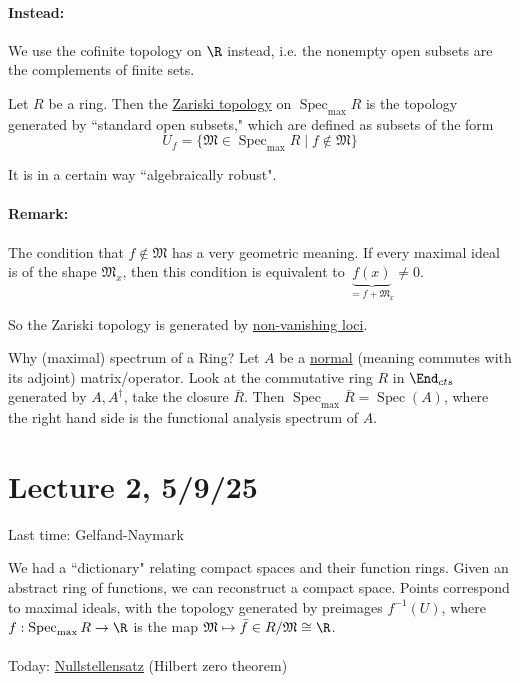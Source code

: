 \documentclass[x11names,reqno,14pt]{extarticle}
\newcommand{\mk}[1]{\mathfrak{#1}}
\newcommand{\barf}{\bar{f}}
\newcommand{\Specmax}{\operatorname{Spec}_{\operatorname{max}}}
\begin{document}
\paragraph{Instead:} We use the cofinite topology on $\R$ instead, i.e. the nonempty open subsets are the complements of finite sets. 


Let $R$ be a ring. Then the \underline{Zariski topology} on $\Specmax R$ is the topology generated by ``standard open subsets," which are defined as subsets of the form 
\[
U_f = \{\mk{M} \in \Specmax R \mid f\not\in \mk{M}\}
\]

It is in a certain way ``algebraically robust". 

\paragraph{Remark:} The condition that $f \not \in \mk{M}$ has a very geometric meaning. If every maximal ideal is of the shape $\mk{M}_x$, then this condition is equivalent to $\underbrace{f(x)}_{=f+\mk{M}_x} \neq 0$. 

So the Zariski topology is generated by \underline{non-vanishing loci}. 

Why (maximal) spectrum of a Ring? Let $A$ be a \underline{normal} (meaning commutes with its adjoint) matrix/operator. Look at the commutative ring $R$ in $\End_{cts}$ generated by $A,A^\dagger$, take the closure $\bar{R}$. Then $\Specmax \bar{R} = \operatorname{Spec}(A)$, where the right hand side is the functional analysis spectrum of $A$. 

\section*{Lecture 2, 5/9/25}

Last time: Gelfand-Naymark

We had a ``dictionary" relating compact spaces and their function rings. Given an abstract ring of functions, we can reconstruct a compact space. Points correspond to maximal ideals, with the topology generated by preimages $f^{-1}(U)$, where $f:\Specmax R\to\R$ is the map $\mk{M}\mapsto \barf\in R/\mk{M}\cong\R$.

\paragraph{}

Today: \underline{Nullstellensatz} (Hilbert zero theorem)
\end{document}
